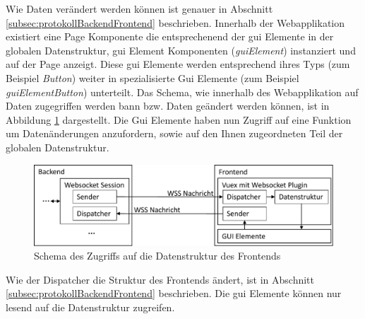 Wie Daten verändert werden können ist genauer in Abschnitt \ref{subsec:protokollBackendFrontend} beschrieben.
Innerhalb der Webapplikation existiert eine Page Komponente die entsprechenend der \ac{gui} Elemente in der globalen Datenstruktur, 
\ac{gui} Element Komponenten (\emph{guiElement}) instanziert und auf der Page anzeigt.
Diese \ac{gui} Elemente werden entsprechend ihres Typs (zum Beispiel \emph{Button}) weiter in spezialisierte Gui Elemente (zum Beispiel \emph{guiElementButton}) unterteilt.
Das Schema, wie innerhalb des Webapplikation auf Daten zugegriffen werden bann bzw. Daten geändert werden können,
ist in Abbildung \ref{fig:dataFlowFrontend} dargestellt.
Die Gui Elemente haben nun Zugriff auf eine Funktion um Datenänderungen anzufordern, sowie auf den Ihnen zugeordneten Teil der globalen Datenstruktur.
\begin{figure}[ht]
  \centering
  \includegraphics[width=\textwidth]{content/hauptteil/systemEntwurf/res/datenzugriffFrontend.pdf}
  \caption[Datenzugriff innerhalb des Frontends]{Schema des Zugriffs auf die Datenstruktur des Frontends}
  \label{fig:dataFlowFrontend}
\end{figure}
Wie der Dispatcher die Struktur des Frontends ändert, ist in Abschnitt \ref{subsec:protokollBackendFrontend} beschrieben.
Die \ac{gui} Elemente können nur lesend auf die Datenstruktur zugreifen.


